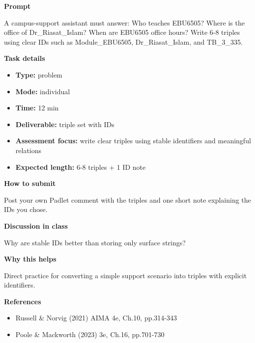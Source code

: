 \documentclass[11pt]{article}
\begin{document}
\begin{tcolorbox}[colback=white,colframe=MidnightBlue,title={Q3 Structured Problem},fonttitle=\bfseries,breakable]
\begin{center}
\end{center}

{\large\bfseries\color{MidnightBlue} Prompt}\par\medskip
A campus-support assistant must answer: Who teaches EBU6505? Where is the office of Dr\_Riasat\_Islam? When are EBU6505 office hours? Write 6-8 triples using clear IDs such as Module\_EBU6505, Dr\_Riasat\_Islam, and TB\_3\_335.

{\large\bfseries\color{MidnightBlue} Task details}\par\medskip
\begin{itemize}\item \textbf{Type:} problem
\item \textbf{Mode:} individual
\item \textbf{Time:} 12 min
\item \textbf{Deliverable:} triple set with IDs
\item \textbf{Assessment focus:} write clear triples using stable identifiers and meaningful relations
\item \textbf{Expected length:} 6-8 triples + 1 ID note\end{itemize}

{\large\bfseries\color{MidnightBlue} How to submit}\par\medskip
Post your own Padlet comment with the triples and one short note explaining the IDs you chose.

{\large\bfseries\color{MidnightBlue} Discussion in class}\par\medskip
Why are stable IDs better than storing only surface strings?

{\large\bfseries\color{MidnightBlue} Why this helps}\par\medskip
Direct practice for converting a simple support scenario into triples with explicit identifiers.

{\large\bfseries\color{MidnightBlue} References}\par\medskip
\begin{itemize}\item Russell \& Norvig (2021) AIMA 4e, Ch.10, pp.314-343
\item Poole \& Mackworth (2023) 3e, Ch.16, pp.701-730\end{itemize}
\end{tcolorbox}
\end{document}
